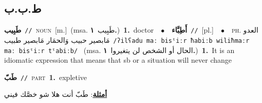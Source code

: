 \documentclass[10pt,a4paper,twoside]{article} %
\begin{document}
\begin{multicols}{2}
\vspace{-3mm}
\subsection*{\color{blue}\foreignlanguage{arabic}{ط.ب.ب}\color{blue}{}} 

{\setlength\topsep{0pt}\textbf{\foreignlanguage{arabic}{طَبِيب}}\ {\color{gray}\texttt{//}\color{black}}\ \textsc{noun}\ [m.]\ \color{gray}(msa. \foreignlanguage{arabic}{طَبِيب}~\foreignlanguage{arabic}{\textbf{١.}})\color{black}\ \textbf{1.}~doctor\ \ $\bullet$\ \ \setlength\topsep{0pt}\textbf{\foreignlanguage{arabic}{أَطِبَّاء}}\ {\color{gray}\texttt{//}\color{black}}\ [pl.]\ \ $\bullet$\ \ \textsc{ph.} \color{gray} \foreignlanguage{arabic}{العدو مَابصير حبيب وَالحمَار مَابصير طبيب}\color{black}\ {\color{gray}\texttt{/{\sffamily ʔilʕadu maː bisˤiːr ħabiːb wiliħmaːr maː bisˤiːr tˤabiːb}/}\color{black}}\ \color{gray} (msa. \foreignlanguage{arabic}{الحال أو الشخص لن يتغيروا}~\foreignlanguage{arabic}{\textbf{١.}})\color{black}\ \textbf{1.}~It is an idiomatic expression that means that sb or a situation will never change\ } \vspace{2mm}

{\setlength\topsep{0pt}\textbf{\foreignlanguage{arabic}{طَبّ}}\ {\color{gray}\texttt{//}\color{black}}\ \textsc{part}\ \textbf{1.}~expletive\  \begin{flushright}\color{gray}\foreignlanguage{arabic}{\textbf{\underline{\foreignlanguage{arabic}{أمثلة}}}: طَبّ أنت هلا شو خصَّك فيني}\end{flushright}\color{black}} \vspace{2mm}


\end{multicols}
\end{document}
